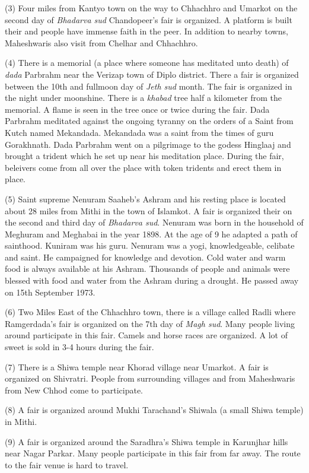 (3) Four miles from Kantyo town on the way to Chhachhro and Umarkot on the
second day of \textit{Bhadarva sud} Chandopeer's fair is organized. A platform
is built their and people have immense faith in the peer. In addition to nearby
towns, Maheshwaris also visit from Chelhar and Chhachhro.

(4) There is a memorial (a place where someone has meditated unto death) of
\textit{dada} Parbrahm near the Verizap town of Diplo district. There a fair is
organized between the 10th and fullmoon day of \textit{Jeth sud} month. The
fair is organized in the night under moonshine. There is a \textit{khabad} tree
half a kilometer from the memorial. A flame is seen in the tree once or twice
during the fair. Dada Parbrahm meditated against the ongoing tyranny on the
orders of a Saint from Kutch named Mekandada. Mekandada was a saint from the
times of guru Gorakhnath. Dada Parbrahm went on a pilgrimage to the godess
Hinglaaj and brought a trident which he set up near his meditation place.
During the fair, beleivers come from all over the place with token tridents and
erect them in place.

(5) Saint supreme Nenuram Saaheb's Ashram and his resting place is located
about 28 miles from Mithi in the town of Islamkot. A fair is organized their on
the second and third day of \textit{Bhadarva sud}. Nenuram was born in the
household of Meghuram and Meghabai in the year 1898. At the age of 9 he adapted
a path of sainthood. Kuniram was his guru. Nenuram was a yogi, knowledgeable,
celibate and saint. He campaigned for knowledge and devotion. Cold water and
warm food is always available at his Ashram. Thousands of people and animals
were blessed with food and water from the Ashram during a drought. He passed
away on 15th September 1973.

(6) Two Miles East of the Chhachhro town, there is a village called Radli where
Ramgerdada's fair is organized on the 7th day of \textit{Magh sud}. Many people
living around participate in this fair. Camels and horse races are organized. A
lot of sweet is sold in 3-4 hours during the fair.

(7) There is a Shiwa temple near Khorad village near Umarkot. A fair is
organized on Shivratri. People from surrounding villages and from Maheshwaris
from New Chhod come to participate.

(8) A fair is organized around Mukhi Tarachand's Shiwala (a small Shiwa temple)
in Mithi.

(9) A fair is organized around the Saradhra's Shiwa temple in Karunjhar hills
near Nagar Parkar. Many people participate in this fair from far away. The
route to the fair venue is hard to travel. 

